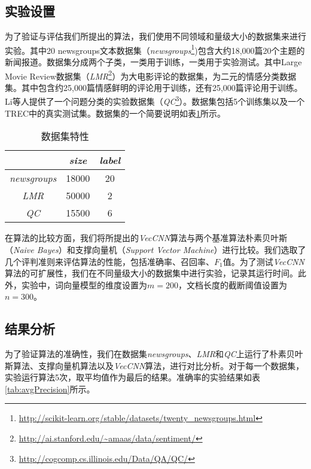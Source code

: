 \subsection{实验设置}
\label{subsec3:settings}
为了验证与评估我们所提出的算法，我们使用不同领域和量级大小的数据集来进行实验。其中20 newsgroups文本数据集（\textit{newsgroups}\footnote{\url{http://scikit-learn.org/stable/datasets/twenty_newsgroups.html}})包含大约18,000篇20个主题的新闻报道。数据集分成两个子类，一类用于训练，一类用于实验测试。其中Large Movie Review数据集（\textit{LMR}\footnote{\url{http://ai.stanford.edu/~amaas/data/sentiment/}}）为大电影评论的数据集，为二元的情感分类数据集。其中包含约25,000篇情感鲜明的评论用于训练，还有25,000篇评论用于训练。Li等人提供了一个问题分类的实验数据集（\textit{QC}\footnote{\url{http://cogcomp.cs.illinois.edu/Data/QA/QC/}}）。数据集包括5个训练集以及一个TREC中的真实测试集。数据集的一个简要说明如表\ref{tab:dataset}所示。

\begin{table}
    \centering
    \caption{数据集特性}\label{tab:dataset}
    \begin{tabular}{ccc}
        \hline
         & \textit{size} & \textit{label}\\
        \hline
        \textit{newsgroups} & 18000 & 20\\
        \hline
        \textit{LMR} & 50000 & 2\\
        \hline
        \textit{QC} & 15500 & 6\\
        \hline
    \end{tabular}
\end{table}

在算法的比较方面，我们将所提出的\textit{VecCNN}算法与两个基准算法朴素贝叶斯（\textit{Naive Bayes}）和支撑向量机（\textit{Support Vector Machine}）进行比较。我们选取了几个评判准则来评估算法的性能，包括准确率、召回率、$F_1$值。为了测试\textit{VecCNN}算法的可扩展性，我们在不同量级大小的数据集中进行实验，记录其运行时间。此外，实验中，词向量模型的维度设置为$m=200$，文档长度的截断阈值设置为$n=300$。

\subsection{结果分析}
\label{subsec3:analysis}
为了验证算法的准确性，我们在数据集\textit{newsgroups}、\textit{LMR}和\textit{QC}上运行了朴素贝叶斯算法、支撑向量机算法以及\textit{VecCNN}算法，进行对比分析。对于每一个数据集，实验运行算法5次，取平均值作为最后的结果。准确率的实验结果如表\ref{tab:avgPrecision}所示。

